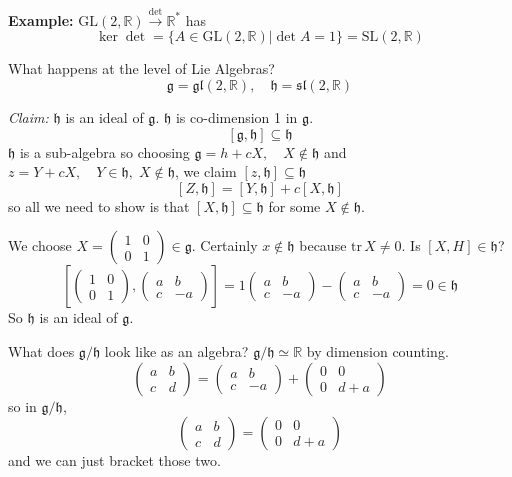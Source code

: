 \documentclass[12pt]{article}
\newcommand{\R}{\mathbb{R}}
\newcommand{\SL}{\text{SL}}
\newcommand{\GL}{\text{GL}}
\newcommand{\tr}{\text{tr}\,}
\newcommand{\g}{\mathfrak{g}}
\newcommand{\h}{\mathfrak{h}}
\begin{document}
    \textbf{Example:} $\GL(2, \R) \overset{\det}{\longrightarrow} \R^*$ has 
    \[\ker \det = \{A \in \GL(2, \R) \big\vert \det A = 1\} = \SL(2, \R)\]

    What happens at the level of Lie Algebras? 
    \[\g = \mathfrak{gl}(2, \R), \quad \h = \mathfrak{sl}(2, \R)\] 

    \emph{Claim:} $\h$ is an ideal of $\g$. $\h$ is co-dimension 1 in $\g$. 
    \[[\g, \h] \subseteq \h\]
    $\h$ is a sub-algebra so choosing $\g = h + cX, \quad X \notin \h$ and $z = Y + cX, \quad Y \in \h, \; X \notin \h$, we claim $[z, \h] \subseteq \h$
    \[[Z, \h] = [Y, \h] + c[X, \h]\]
    so all we need to show is that $[X, \h] \subseteq \h$ for some $X \notin \h$. 
    
    We choose $X = \begin{pmatrix}
        1 & 0\\
        0 & 1
    \end{pmatrix} \in \g$. Certainly $x \notin \h$ because $\tr X \neq 0$. Is $[X, H] \in \h$? 
    \[\left[\begin{pmatrix}
        1 & 0\\ 
        0 & 1
    \end{pmatrix}, \begin{pmatrix}
        a & b\\ 
        c & -a
    \end{pmatrix}\right] = 1 \begin{pmatrix}
        a & b\\ 
        c & -a
    \end{pmatrix} -  \begin{pmatrix}
        a & b\\ 
        c & -a
    \end{pmatrix} = 0 \in \h\] 
    So $\h$ is an ideal of $\g$. 

    What does $\g/\h$ look like as an algebra? $\g/\h \simeq \R$ by dimension counting. 
    \[\begin{pmatrix}
        a & b\\ 
        c & d
    \end{pmatrix} = \begin{pmatrix}
        a & b\\ 
        c & -a
    \end{pmatrix} + \begin{pmatrix}
        0 & 0\\ 
        0 & d + a
    \end{pmatrix}\]
    so in $\g/\h$, 
    \[\begin{pmatrix}
        a & b\\ 
        c & d
    \end{pmatrix} = \begin{pmatrix}
        0 & 0\\ 
        0 & d + a
    \end{pmatrix}\]
    and we can just bracket those two. 
\end{document}
